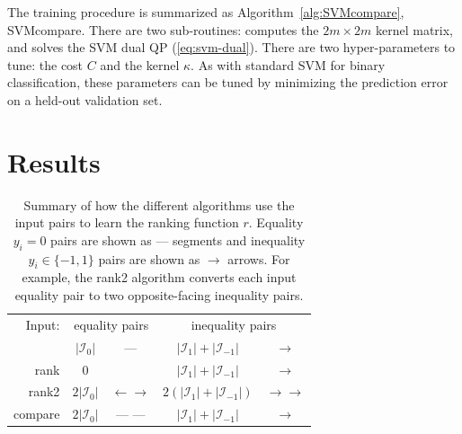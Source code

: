 \documentclass[twoside,11pt]{article}
\begin{document}
The training procedure is summarized as
Algorithm~\ref{alg:SVMcompare}, SVMcompare.
There are two sub-routines:  computes
the $2m\times 2m$ kernel matrix, and  solves the SVM
dual QP (\ref{eq:svm-dual}). There are two hyper-parameters to tune:
the cost $C$ and the kernel $\kappa$. As with standard SVM for binary
classification, these parameters can be tuned by minimizing the
prediction error on a held-out validation set.

\section{Results}
\label{sec:results}



\begin{table}[b!]
  \centering
  \begin{tabular}{r|cc|cc|}
Input:&    \multicolumn{2}{c|}{equality pairs}
&    \multicolumn{2}{c|}{inequality pairs}\\
    & $|\mathcal I_0|$ %
    & --- 
    & $|\mathcal I_1|+|\mathcal I_{-1}|$ %
    & $\rightarrow$
    \\
    \hline
    rank 
    & 0 
    & 
    & $|\mathcal I_1|+|\mathcal I_{-1}|$ 
    & $\rightarrow$ 
    \\
    \hline
    rank2 
    & $2|\mathcal I_0|$ 
    & $\leftarrow \rightarrow$
    & $2(|\mathcal I_1|+|\mathcal I_{-1}|)$ 
    & $\rightarrow \rightarrow$
    \\
    \hline
    compare 
    & $2|\mathcal I_0|$ 
    & --- --- 
    & $|\mathcal I_1|+|\mathcal I_{-1}|$ 
    & $\rightarrow$\\
    \hline
  \end{tabular}
  \caption{\label{tab:models}
    Summary of how the different algorithms 
    use the input pairs to learn the ranking 
    function $r$. Equality $y_i=0$ pairs are shown as ---  
    segments and inequality $y_i\in\{-1,1\}$ pairs 
    are shown as $\rightarrow$  arrows. For example, 
    the rank2 algorithm converts each input equality pair
    to two opposite-facing inequality pairs.}
\end{table}
\end{document}
